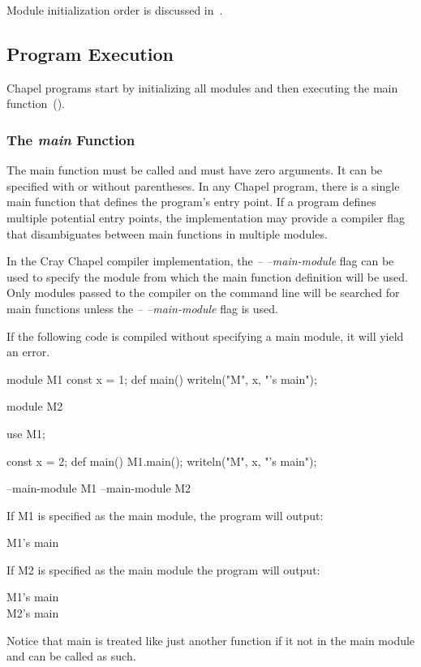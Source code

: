 Module initialization order is discussed
in~.



\subsection{Program Execution}
\label{Program_Execution}

Chapel programs start by initializing all modules and then executing
the main function~().

\subsubsection{The {\em main} Function}
\label{The_main_Function}

The main function must be called  and must have zero
arguments.  It can be specified with or without parentheses.  In any
Chapel program, there is a single main function that defines the
program's entry point.  If a program defines multiple potential entry
points, the implementation may provide a compiler flag that
disambiguates between main functions in multiple modules.

\begin{craychapel}
In the Cray Chapel compiler implementation, the \emph{--
--main-module} flag can be used to specify the module from which the
main function definition will be used.  Only modules passed to the
compiler on the command line will be searched for main functions
unless the \emph{-- --main-module} flag is used.
\end{craychapel}

\begin{example}
If the following code is compiled without specifying a main module, it
will yield an error.
\begin{chapelpre}
\end{chapelpre}
\begin{chapel}
module M1 {
  const x = 1;
  def main() {
    writeln("M", x, "'s main");
  }
}
 
module M2 {
  use M1;

  const x = 2;
  def main() {
    M1.main();
    writeln("M", x, "'s main");
  }
}
\end{chapel}
\begin{chapelcompopts}
--main-module M1
--main-module M2
\end{chapelcompopts}
If M1 is specified as the main module, the program will output:
\begin{printchapeloutput}
M1's main
\end{printchapeloutput}
If M2 is specified as the main module the program will output:
\begin{printchapeloutput}
M1's main\\
M2's main
\end{printchapeloutput}
Notice that main is treated like just another function if it not in
the main module and can be called as such.
\end{example}

